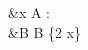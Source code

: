 \documentclass[preview]{standalone}
\begin{document}
\begin{center}
 &x \in A : \\&B \leftarrow B \cup \{2 \cdot x\}
\end{center}
\end{document}
